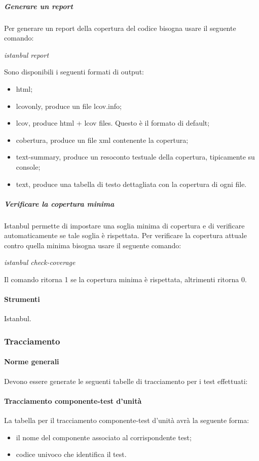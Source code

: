 \subparagraph{Generare un report}
Per generare un report della copertura del codice bisogna usare il seguente comando:\\

\begin{center}
\textit{istanbul report}\\
\end{center}
Sono disponibili i seguenti formati di output:
\begin{itemize}
\item html;
\item lcovonly, produce un file lcov.info;
\item lcov, produce html + lcov files. Questo è il formato di default;
\item cobertura, produce un file xml contenente la copertura;
\item text-summary, produce un resoconto testuale della copertura, tipicamente su console;
\item text, produce una tabella di testo dettagliata con la copertura di ogni file.
\end{itemize}

\subparagraph{Verificare la copertura minima}
Istanbul permette di impostare una soglia minima di copertura e di verificare automaticamente se tale soglia è rispettata.
Per verificare la copertura attuale contro quella minima bisogna usare il seguente comando:\\
\begin{center}
\textit{istanbul check-coverage}\\
\end{center}
Il comando ritorna 1 se la copertura minima è rispettata, altrimenti ritorna 0.


\paragraph{Strumenti}
Istanbul.


\subsubsection{Tracciamento}

\paragraph{Norme generali}
Devono essere generate le seguenti tabelle di tracciamento per i test effettuati:

\paragraph{Tracciamento componente-test d'unità}
La tabella per il tracciamento componente-test d'unità avrà la seguente forma:
\begin{itemize}
\item {} il nome del componente associato al corrispondente test;
\item {}codice univoco che identifica il test.
\end{itemize}

